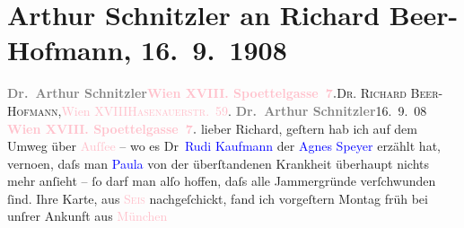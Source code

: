 

               \section[Arthur Schnitzler an Richard Beer-Hofmann, 16. 9. 1908]{ Arthur Schnitzler an Richard Beer-Hofmann, 16. 9. 1908}\nopagebreak{}\rehead{ }\normalsize\beginnumbering{} \toendnotes[C]{\smallbreak\pagebreak[2]} 
\toendnotes[C]{\smallbreak}\pstart{}{\pb}\textcolor{gray}{\textbf{Dr. Arthur Schnitzler}}\pend{}\pstart{}\textcolor{gray}{\textbf{\textcolor{pink}{Wien XVIII. Spoettelgasse 7}{}\ledrightnote{\textcolor{pink}{Edmund-Weiß-Gasse}}.}}\pend{}{\bigskip}\pstart{}{\pb}\textsc{Dr. Richard Beer-Hofmann,}\pend{}\pstart{}\textcolor{pink}{Wien XVIII}{}\ledrightnote{\textcolor{pink}{XVIII., Währing}}\pend{}\pstart{}\textcolor{pink}{\textsc{Hasenauerstr. 59}}{}\ledrightnote{\textcolor{pink}{Hasenauerstraße}}.\pend{}{\bigskip}\pstart
           \noindent{}{\pb}\textcolor{gray}{\textbf{Dr. Arthur Schnitzler}}\hfill 16. 9. 08\pend
           \pstart
           \textcolor{gray}{\textbf{\textcolor{pink}{Wien XVIII. Spoettelgasse 7}{}\ledrightnote{\textcolor{pink}{Edmund-Weiß-Gasse}}.}}\pend
           \pstart
           lieber Richard, geſtern hab ich auf dem Umweg über \textcolor{pink}{Auſſee}{}\ledrightnote{\textcolor{pink}{Bad Aussee}} – wo es Dr \textcolor{blue}{Rudi
                  Kaufmann}{}\ledrightnote{\textcolor{blue}{Rudolf Kaufmann}} der \textcolor{blue}{Agnes Speyer}{}\ledrightnote{\textcolor{blue}{Agnes Ulmann}} erzählt hat,
                  verno{\geminationm}en, daſs man \textcolor{blue}{Paula}{}\ledrightnote{\textcolor{blue}{Paula Beer-Hofmann}} von der überſtandenen Krankheit überhaupt nichts mehr anſieht – ſo
               darf man alſo hoffen, daſs alle Jammergründe verſchwunden ſind. Ihre Karte, aus \textsc{\textcolor{pink}{Seis}{}\ledrightnote{\textcolor{pink}{Seis am Schlern}}} nachgeſchickt, fand ich vorgeſtern Montag früh bei unſrer An{\pb}kunft aus \textcolor{pink}{München}{}\ledrightnote{\textcolor{pink}{München}}
